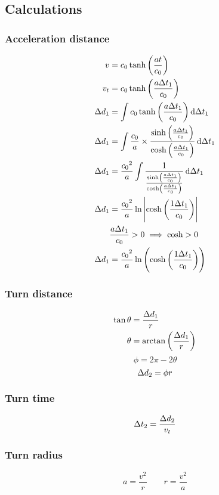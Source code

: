 	\subsection{Calculations}
		\begin{samepagecols}{2}
			\subsubsection{Acceleration distance}
			\begin{align*}
				v &= \si{\clight}\tanh\left(\frac{at}{\si{\clight}}\right)\\
				v_t &= \si{\clight}\tanh\left(\frac{a \Del t_1}{\si{\clight}}\right)\\
				\Del d_1 &= \int \si{\clight}\tanh\left(\frac{a \Del t_1}{\si{\clight}}\right) \dif \Del t_1\\
				\Del d_1 &= \int \frac{\si{\clight}}{a} \times \frac{\sinh\left(\frac{a \Del t_1}{\si{\clight}}\right)}{\cosh\left(\frac{a \Del t_1}{\si{\clight}}\right)} \dif \Del t_1\\
				\Del d_1 &= \frac{\si{\clight}^2}{a} \int \frac{1}{\frac{\sinh\left(\frac{a \Del t_1}{\si{\clight}}\right)}{\cosh\left(\frac{a \Del t_1}{\si{\clight}}\right)}} \dif \Del t_1\\
				\Del d_1 &= \frac{\si{\clight}^2}{a} \ln\left| \cosh\left(\frac{1 \Del t_1}{\si{\clight}}\right)\right|\\
				&\frac{a \Del t_1}{\si{\clight}} > 0 \implies \cosh > 0\\
				\Del d_1 &= \frac{\si{\clight}^2}{a} \ln\left(\cosh\left(\frac{1 \Del t_1}{\si{\clight}}\right)\right)
			\end{align*}
			\columnbreak
			\subsubsection{Turn distance}
				\begin{align*}
					\tan \theta &= \frac{\mathrm{\Delta} d_1}{r}\\
					\theta &= \arctan\left(\frac{\mathrm{\Delta} d_1}{r}\right)
				\end{align*}
				\begin{equation*}
					\phi = 2\pi - 2\theta
				\end{equation*}
				\begin{equation*}
					\mathrm{\Delta} d_2 = \phi r
				\end{equation*}
			\subsubsection{Turn time}
				\begin{equation*}
					\mathrm{\Delta} t_2 = \frac{\mathrm{\Delta} d_2}{v_t}
				\end{equation*}
			\subsubsection{Turn radius}
				\begin{equation*}
					a = \frac{v^2}{r} \qquad r = \frac{v^2}{a}
				\end{equation*}
		\end{samepagecols}
	\newpage
